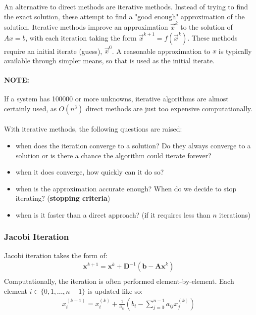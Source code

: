 \documentclass{article}
\begin{document}
An alternative to direct methods are iterative methods. Instead of trying to find the exact solution, these attempt to find a "good enough" approximation of the solution. Iterative methods improve an approximation $\vec{x}^{k}$ to the solution of $Ax = b$, with each iteration taking the form $\vec{x}^{k + 1} = f(\vec{x}^{k})$. These methods require an initial iterate (guess), $\vec{x}^{0}$. A reasonable approximation to $x$ is typically available through simpler means, so that is used as the initial iterate.

\paragraph{\textbf{NOTE:}} If a system has 100000 or more unknowns, iterative algorithms are almost certainly used, as $O(n^3)$ direct methods are just too expensive computationally.

\paragraph{}

With iterative methods, the following questions are raised:
\begin{itemize}
	\item when does the iteration converge to a solution? Do they always converge to a solution or is there a chance the algorithm could iterate forever?
	\item when it does converge, how quickly can it do so?
	\item when is the approximation accurate enough? When do we decide to stop iterating? (\textbf{stopping criteria})
	\item when is it faster than a direct approach? (if it requires less than $n$ iterations)
\end{itemize}

\subsubsection{Jacobi Iteration}

Jacobi iteration takes the form of:
\begin{multline}
	\mathbf{x}^{k+1} = \mathbf{x}^{k} + \mathbf{D}^{-1}(\mathbf{b} - \mathbf{Ax}^{k})\\
	\label{eq:jacobi}
\end{multline}
Computationally, the iteration is often performed element-by-element. Each element $i \in \lbrace 0, 1, ..., n - 1 \rbrace$ is updated like so:
\begin{multline}
	x_i^{(k+1)} = x_i^{(k)} + \frac{1}{a_{ii}}(b_i - \sum_{j=0}^{n - 1} {a_{ij}x_{j}^{(k)}})
	\\
	\label{eq:jacobi-elembyelem}
\end{multline}
\end{document}
